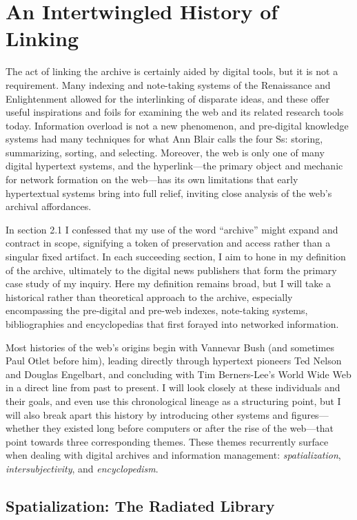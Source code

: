 \chapter{An Intertwingled History of Linking}

The act of linking the archive is certainly aided by digital tools, but it is not a requirement. Many indexing and note-taking systems of the Renaissance and Enlightenment allowed for the interlinking of disparate ideas, and these offer useful inspirations and foils for examining the web and its related research tools today. Information overload is not a new phenomenon, and pre-digital knowledge systems had many techniques for what Ann Blair calls the four Ss: storing, summarizing, sorting, and selecting.\autocite[85]{blair_note_2004} Moreover, the web is only one of many digital hypertext systems, and the hyperlink---the primary object and mechanic for network formation on the web---has its own limitations that early hypertextual systems bring into full relief, inviting close analysis of the web's archival affordances.

In section 2.1 I confessed that my use of the word ``archive'' might expand and contract in scope, signifying a token of preservation and access rather than a singular fixed artifact. In each succeeding section, I aim to hone in my definition of the archive, ultimately to the digital news publishers that form the primary case study of my inquiry. Here my definition remains broad, but I will take a historical rather than theoretical approach to the archive, especially encompassing the pre-digital and pre-web indexes, note-taking systems, bibliographies and encyclopedias that first forayed into networked information.

Most histories of the web's origins begin with Vannevar Bush (and sometimes Paul Otlet before him), leading directly through hypertext pioneers Ted Nelson and Douglas Engelbart, and concluding with Tim Berners-Lee's World Wide Web in a direct line from past to present. I will look closely at these individuals and their goals, and even use this chronological lineage as a structuring point, but I will also break apart this history by introducing other systems and figures---whether they existed long before computers or after the rise of the web---that point towards three corresponding themes. These themes recurrently surface when dealing with digital archives and information management: \emph{spatialization}, \emph{intersubjectivity}, and \emph{encyclopedism}.

\section{Spatialization: The Radiated Library}

